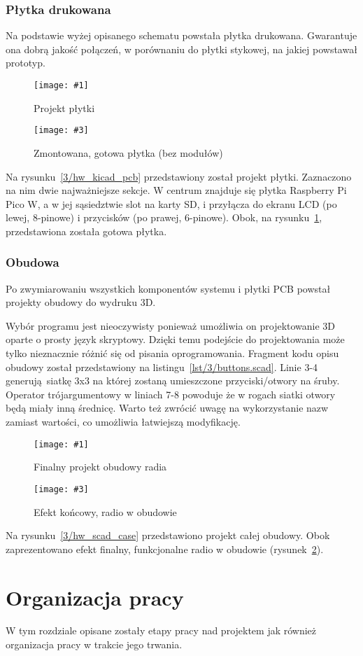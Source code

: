 \documentclass[polish]{aghengthesis}
\newcommand{\imgintss}[5]{
	\begin{figure}[{#5}]
		\centering
		\begin{minipage}{.45\textwidth}
			\centering
			\texttt{[image: \#1]}
			\caption{#2}
			\label{#1}
		\end{minipage}%
		\hfill
		\begin{minipage}{.45\textwidth}
			\centering
			\texttt{[image: \#3]}
			\caption{#4}
			\label{#3}
		\end{minipage}
	\end{figure}
}
\newcommand{\imghss}[4]{\imgintss{#1}{#2}{#3}{#4}{H}}
\newcommand{\lstfile}[3]{
	\noindent
	\hspace{0.1\linewidth}
	\begin{minipage}{0.8\linewidth}
		
	\end{minipage}
	\vspace{0.3cm}
}
\begin{document}
		\subsection{Płytka drukowana}
			Na podstawie wyżej opisanego schematu powstała płytka drukowana. Gwarantuje ona dobrą jakość połączeń, w porównaniu do płytki stykowej, na jakiej powstawał prototyp.
		
			\imghss{3/hw_kicad_pcb}{Projekt płytki}{3/hw_pcb}{Zmontowana, gotowa płytka (bez modułów)}
			
			Na rysunku~\ref{3/hw_kicad_pcb} przedstawiony został projekt płytki. Zaznaczono na nim dwie najważniejsze sekcje. W centrum znajduje się płytka Raspberry Pi Pico W, a w jej sąsiedztwie slot na karty SD, i przyłącza do ekranu LCD (po lewej, 8-pinowe) i przycisków (po prawej, 6-pinowe). Obok, na rysunku~\ref{3/hw_pcb}, przedstawiona została gotowa płytka.
			
		\subsection{Obudowa}
			Po zwymiarowaniu wszystkich komponentów systemu i płytki PCB powstał projekty obudowy do wydruku 3D.
			
			\lstfile{scad}{Kod generujący otwory na przyciski i śruby montażowe}{lst/3/buttons.scad}
			
			Wybór programu jest nieoczywisty ponieważ umożliwia on projektowanie 3D oparte o prosty język skryptowy. Dzięki temu podejście do projektowania może tylko nieznacznie różnić się od pisania oprogramowania. Fragment kodu opisu obudowy został przedstawiony na listingu~\ref{lst/3/buttons.scad}. Linie 3-4 generują siatkę 3x3 na której zostaną umieszczone przyciski/otwory na śruby. Operator trójargumentowy w liniach 7-8 powoduje że w rogach siatki otwory będą miały inną średnicę. Warto też zwrócić uwagę na wykorzystanie nazw zamiast wartości, co umożliwia łatwiejszą modyfikację.
			
			\imghss{3/hw_scad_case}{Finalny projekt obudowy radia}{3/hw_case}{Efekt końcowy, radio w obudowie}
			
			Na rysunku~\ref{3/hw_scad_case} przedstawiono projekt całej obudowy. Obok zaprezentowano efekt finalny, funkcjonalne radio w obudowie (rysunek~\ref{3/hw_case}).
			
\chapter{Organizacja pracy}
	W tym rozdziale opisane zostały etapy pracy nad projektem jak również organizacja pracy w trakcie jego trwania.
	
\end{document}
